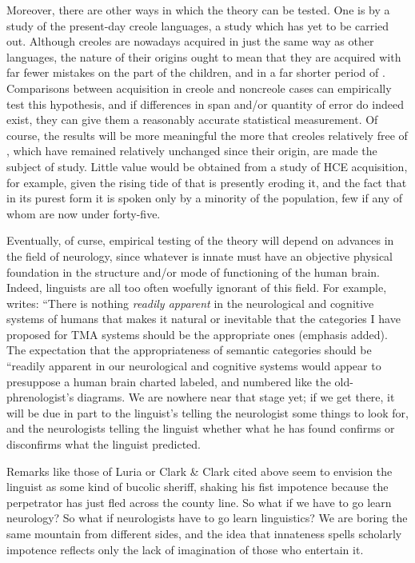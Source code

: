 Moreover, there are other ways in which the theory can be tested. One is by a study of the present-day  creole languages, a study which has yet to be carried out. Although creoles are nowadays acquired in just the same way as other languages, the nature of their origins ought to mean that they are acquired with far fewer mistakes on the part of the children, and in a far shorter period of . Comparisons between acquisition in creole and noncreole cases can empirically test this hypothesis, and if differences in  span and/or quantity of error do indeed exist, they can give them a reasonably accurate statistical measurement. Of course, the results will be more meaningful the more that creoles relatively free of , which have remained relatively unchanged since their origin, are made the subject of study. Little value would be obtained from a study of HCE acquisition, for example, given the rising tide of  that is presently eroding it, and the fact that in its purest form it is spoken only by a minority of the population, few if any of whom are now under forty-five.


Eventually, of curse, empirical testing of the theory will depend on advances in the field of neurology, since whatever is innate must have an objective physical foundation in the structure and/or mode of functioning of the human brain. Indeed, linguists are all too often woefully ignorant of this field. For example, \citet{Alleyne1979} writes: ``There is nothing \textit{readily apparent} in the neurological and cognitive systems of humans that makes it natural or inevitable that the categories I have proposed for TMA systems should be the appropriate ones (emphasis added). The expectation that the appropriateness of semantic categories should be ``readily apparent in our neurological and cognitive systems would appear to presuppose a human brain charted labeled, and numbered like the old- phrenologist's diagrams. We are nowhere near that stage yet; if we get there, it will be due in part to the linguist's telling the neurologist some things to look for, and the neurologists telling the linguist whether what he has found confirms or disconfirms what the linguist predicted.

Remarks like those of Luria or Clark \& Clark cited above seem to envision the linguist as some kind of bucolic sheriff, shaking his fist impotence because the perpetrator has just fled across the county line. So what if we have to go learn neurology? So what if neurologists have to go learn linguistics? We are boring the same mountain from different sides, and the idea that innateness spells scholarly impotence reflects only the lack of imagination of those who entertain it.

